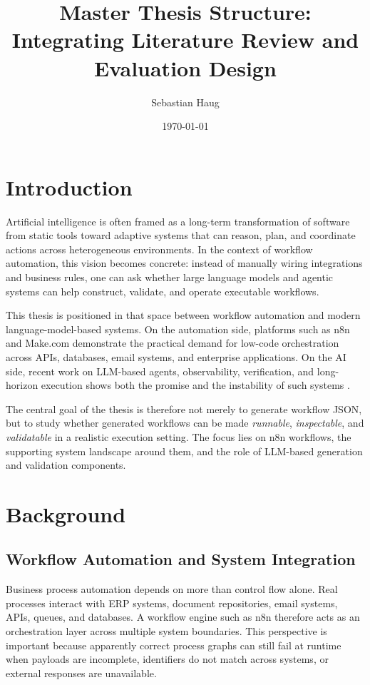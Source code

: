 \documentclass[12pt,a4paper]{article}
\title{Master Thesis Structure: Integrating Literature Review and Evaluation Design}
\author{Sebastian Haug}
\date{\today}
\begin{document}
\maketitle
\tableofcontents
\newpage

\section{Introduction}

Artificial intelligence is often framed as a long-term transformation of software from static tools toward adaptive systems that can reason, plan, and coordinate actions across heterogeneous environments. In the context of workflow automation, this vision becomes concrete: instead of manually wiring integrations and business rules, one can ask whether large language models and agentic systems can help construct, validate, and operate executable workflows.

This thesis is positioned in that space between workflow automation and modern language-model-based systems. On the automation side, platforms such as n8n and Make.com demonstrate the practical demand for low-code orchestration across APIs, databases, email systems, and enterprise applications. On the AI side, recent work on LLM-based agents, observability, verification, and long-horizon execution shows both the promise and the instability of such systems \cite{dong2024agentops_observability,he2024llm_multiagent_se_review,barrak2025traceability_accountability_multiagent}.

The central goal of the thesis is therefore not merely to generate workflow JSON, but to study whether generated workflows can be made \emph{runnable}, \emph{inspectable}, and \emph{validatable} in a realistic execution setting. The focus lies on n8n workflows, the supporting system landscape around them, and the role of LLM-based generation and validation components.

\section{Background}

\subsection{Workflow Automation and System Integration}

Business process automation depends on more than control flow alone. Real processes interact with ERP systems, document repositories, email systems, APIs, queues, and databases. A workflow engine such as n8n therefore acts as an orchestration layer across multiple system boundaries. This perspective is important because apparently correct process graphs can still fail at runtime when payloads are incomplete, identifiers do not match across systems, or external responses are unavailable.
\end{document}
